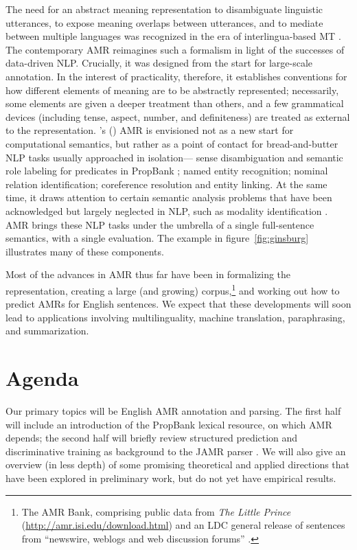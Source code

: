 \documentclass[11pt,letterpaper]{article}
\newcommand{\fref}[1]{figure~\ref{#1}}
\newcommand{\Citeposs}[2][]{\Citeauthor{#2}'s (\citeyear[#1]{#2})}
\begin{document}
The need for an abstract meaning representation to disambiguate linguistic utterances, 
to expose meaning overlaps between utterances, and to mediate between multiple languages 
was recognized in the era of interlingua-based MT \citep{dorr-98}. 
The contemporary AMR reimagines such a formalism in light of the successes of data-driven NLP.
Crucially, it was designed from the start for large-scale annotation. 
In the interest of practicality, therefore, it establishes conventions for how different elements 
of meaning are to be abstractly represented; necessarily, some elements are given a deeper treatment 
than others, and a few grammatical devices (including tense, aspect, number, and definiteness) 
are treated as external to the representation.
\Citeposs{amr} AMR is envisioned not as a new start for computational semantics, 
but rather as a point of contact for bread-and-butter NLP tasks usually approached in isolation---%
sense disambiguation and semantic role labeling for predicates in PropBank \citep{propbank,bonial-14}; 
named entity recognition; nominal relation identification; 
coreference resolution and entity linking. 
At the same time, it draws attention to certain semantic analysis problems that have been 
acknowledged but largely neglected in NLP, such as modality identification \citep{prabhakaran-12}.
AMR brings these NLP tasks under the umbrella of a single full-sentence semantics, 
with a single evaluation. The example in \fref{fig:ginsburg} illustrates many of these components.

Most of the advances in AMR thus far have been in formalizing the representation, 
creating a large (and growing) corpus,\footnote{The AMR Bank, comprising 
public data from \textit{The Little Prince} (\url{http://amr.isi.edu/download.html}) 
and an LDC general release of sentences from ``newswire, weblogs and web discussion forums'' \citep{amr-ldc}.} 
and working out how to predict AMRs for English sentences. 
We expect that these developments will soon lead to applications 
involving multilinguality, machine translation, paraphrasing, and summarization.



\section{Agenda}

Our primary topics will be English AMR annotation and parsing. 
The first half will include an introduction of the PropBank lexical resource, on which AMR depends; 
the second half will briefly review structured prediction and discriminative training 
as background to the JAMR parser \citep{flanigan-14}.
We will also give an overview (in less depth) of some promising theoretical and applied directions 
that have been explored in preliminary work, but do not yet have empirical results.
\end{document}
